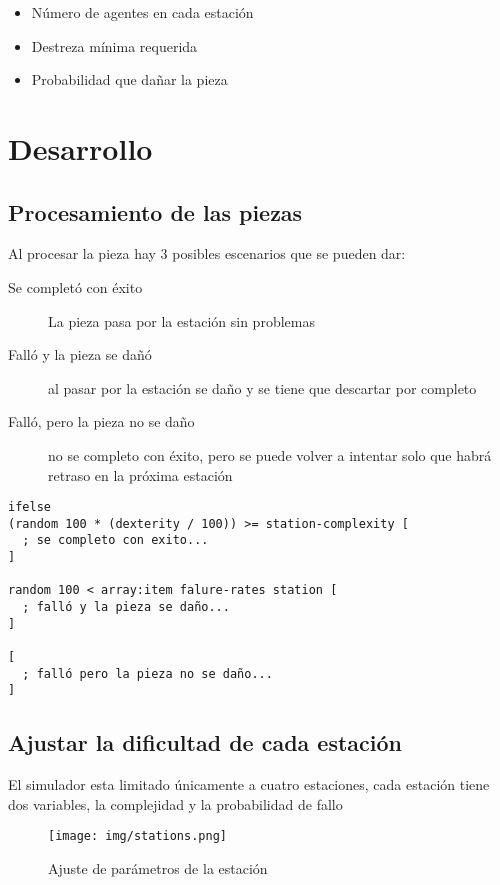 \documentclass[11pt]{article}
\begin{document}
\begin{itemize}
\item Número de agentes en cada estación
\item Destreza mínima requerida
\item Probabilidad que dañar la pieza
\end{itemize}

\section{Desarrollo}
\label{sec:org0e7145d}
\subsection{Procesamiento de las piezas}
\label{sec:org8e5b20c}
Al procesar la pieza hay 3 posibles escenarios que se pueden dar:
\begin{description}
\item[{Se completó con éxito}] La pieza pasa por la estación sin problemas
\item[{Falló y la pieza se dañó}] al pasar por la estación se daño y se tiene que descartar por completo
\item[{Falló, pero la pieza no se daño}] no se completo con éxito, pero se puede volver a intentar solo que habrá retraso en la próxima estación
\end{description}

\begin{verbatim}
ifelse
(random 100 * (dexterity / 100)) >= station-complexity [
  ; se completo con exito...
]

random 100 < array:item falure-rates station [
  ; falló y la pieza se daño...
]

[
  ; falló pero la pieza no se daño...
]
\end{verbatim}

\subsection{Ajustar la dificultad de cada estación}
\label{sec:org8e847a4}
El simulador esta limitado únicamente a cuatro estaciones, cada estación tiene dos variables, la complejidad y la probabilidad de fallo

\begin{figure}[htbp]
\centering
\texttt{[image: img/stations.png]}
\caption{Ajuste de parámetros de la estación}
\end{figure}
\end{document}
